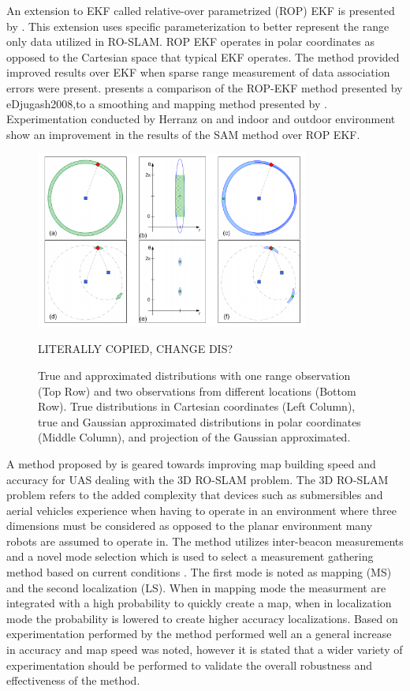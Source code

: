 \documentclass[conference]{IEEEtran}
\begin{document}
An extension to EKF called relative-over parametrized (ROP) EKF is presented by \cite{Djugash2008}. This extension uses specific parameterization to  better represent the range only data utilized in RO-SLAM. ROP EKF operates in polar coordinates as opposed to the Cartesian space that typical EKF operates. The method provided improved results over EKF when sparse range measurement of data association errors were present. \cite{Herranz2014} presents a comparison of the ROP-EKF method presented by \cite{Djugash2008}e{Djugash2008},to a smoothing and mapping method presented by \cite{Dellaert2006}. Experimentation conducted by Herranz on and indoor and outdoor environment show an improvement in the results of the SAM method over ROP EKF.
\begin{figure}[h!]
	\centering
	\includegraphics[width=90mm]{ROP_djugash.png}
	\caption{True and approximated distributions with one range observation (Top Row) and two observations from different locations (Bottom Row). True distributions in	Cartesian coordinates (Left Column), true and Gaussian approximated distributions in polar coordinates (Middle Column), and projection of the Gaussian approximated. \cite{Djugash2008}} LITERALLY COPIED, CHANGE DIS?%
	\label{ROP_djugash}
\end{figure}
\FloatBarrier


A method proposed by \cite{Dios2015} is geared towards improving map building speed and accuracy for UAS dealing with the 3D RO-SLAM problem. The 3D RO-SLAM problem refers to the added complexity that devices such as submersibles \cite{Newman} and aerial vehicles experience when having to operate in an environment where three dimensions must be considered as opposed to the planar environment many robots are assumed to operate in. The method utilizes inter-beacon measurements and a novel mode selection which is used to select a measurement gathering method based on current conditions \cite{Dios2015}. The first mode is noted as mapping (MS) and the second localization (LS). When in mapping mode the measurment are integrated with a high probability to quickly create a map, when in localization mode the probability is lowered to create higher accuracy localizations. Based on experimentation performed by \cite{Dios2015} the method performed well an a general increase in accuracy and map speed was noted, however it is stated that a wider variety of experimentation should be performed to validate the overall robustness and effectiveness of the method.
	
\end{document}
